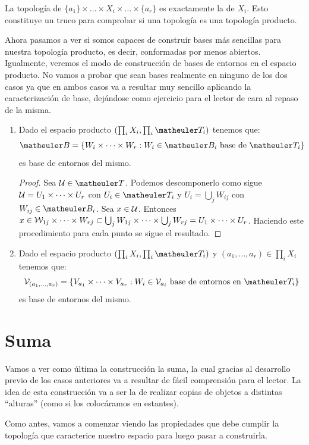 \begin{obs}[Consecuencias]
	La topología de $\{a_1\}\times\dots\times X_i \times \dots \times\{a_r\}$ es exactamente la de $X_i$. Esto constituye un truco para comprobar si una topología es una topología producto.
\end{obs}
	

Ahora pasamos a ver si somos capaces de construir bases más sencillas para nuestra topología producto, es decir, conformadas por menos abiertos. Igualmente, veremos el modo de construcción de bases de entornos en el espacio producto. No vamos a probar que sean bases realmente en ninguno de los dos casos ya que en ambos casos va a resultar muy sencillo aplicando la caracterización de base, dejándose como ejercicio para el lector de cara al repaso de la misma.
\begin{enumerate}
	\item Dado el espacio producto $(\prod_iX_i,\prod_i\T_i)$ tenemos que: \[\B=\{W_i\times\cdots\times W_r:W_i\in \B_i \text{ base de }\T_i\}\] es base de entornos del mismo.
	\begin{proof}
		Sea $\U \in \T$. Podemos descomponerlo como sigue $\mathcal{U} =U_1 \times \dots \times U_r $ con $U_i \in \T_i$ y $U_i = \bigcup_j W_{ij}$ con $W_{ij} \in \B_i$. Sea $x \in \mathcal{U}$. Entonces $x \in \mathcal{W}_{1j} \times \dots \times W_{rj} \subset \bigcup_j W_{1j} \times \dots \times \bigcup_j W_{rj} = U_1 \times \dots \times U_r$. Haciendo este procedimiento para cada punto se sigue el resultado.
	\end{proof}

	\item Dado el espacio producto $(\prod_iX_i,\prod_i\T_i)$ y $(a_1,\dots,a_r)\in\prod_iX_i$ tenemos que: \[\V_{(a_1,\dots,a_r)}=\{V_{a_1}\times\cdots\times V_{a_r}:W_i\in \V_{a_i} \text{ base de entornos en } \T_i\} \] es base de entornos del mismo.
\end{enumerate}
		
\section{Suma}
Vamos a ver como última la construcción la suma, la cual gracias al desarrollo previo de los casos anteriores va a resultar de fácil comprensión para el lector. La idea de esta construcción va a ser la de realizar copias de objetos a distintas ``alturas'' (como si los colocáramos en estantes). 

Como antes, vamos a comenzar viendo las propiedades que debe cumplir la topología que caracterice nuestro espacio para luego pasar a construirla.

